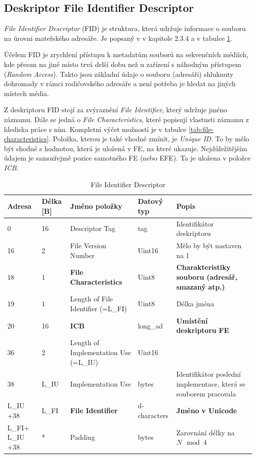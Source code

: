 \subsection{Deskriptor File Identifier Descriptor}
\label{subsec:fid}
\textit{File Identifier Descriptor} (FID) je struktura, která udržuje informace o souboru na úrovni mateřského adresáře. Je popsaný v \cite{osta-udf-0201} v kapitole 2.3.4 a v tabulce \ref{tab:fid}.

Účelem FID je zrychlení přístupu k metadatům souborů na sekvenčních médiích, kde přesun na jiné místo trvá delší dobu než u zařízení s náhodným přístupem (\textit{Random Access}). Takto jsou základní údaje o souboru (adresáři) shluknuty dohromady v rámci rodičovského adresáře a není potřeba je hledat na jiných místech média.

Z deskriptoru FID stojí za zvýraznění \textit{File Identifier}, který udržuje jméno záznamu. Dále se jedná o \textit{File Characteristics}, které popisují vlastnsti záznamu z hlediska práce s ním. Kompletní výčet možností je v tabulce \ref{tab:file-characteristics}. Položka, kterou je také vhodné zmínit, je \textit{Unique ID}. To by mělo být shodné s hodnotou, která je uložená v FE, na které ukazuje. Nejdůležitějším údajem je samozřejmě pozice samotného FE (nebo EFE). Ta je uložena v položce \textit{ICB}. 
\begin{table}[]
    \centering
    \begin{tabular}{ | l | l | p{3.7cm} | p{1.8cm} | p{4.2cm} | }
        \hline
        Adresa  & Délka [B]   & Jméno položky & Datový typ    & Popis \\ \hline\hline
        0   &16               & Descriptor Tag                    & tag           & Identifikátor deskriptoru \\ \hline
        16  &2                & File Version Number               & Uint16        & Mělo by být nastaven na 1 \\ \hline
        18  &1                & \textbf{File Characteristics}     & Uint8         & \textbf{Charakteristiky souboru (adresář, smazaný atp.)} \\ \hline
        19  &1                & Length of File Identifier (=L\_FI)& Uint8         & Délka jména \\ \hline
        20  &16               & \textbf{ICB}                      & long\_ad      & \textbf{Umístění deskriptoru FE} \\ \hline
        36  &2                & Length of Implementation Use (=L\_IU)& Uint16     &  \\ \hline
        38  &L\_IU            & Implementation Use                & bytes         & Identifikátor poslední implementace, která se souborem pracovala \\ \hline
        L\_IU$+38$&L\_FI      & \textbf{File Identifier}          & d-characters  & \textbf{Jméno v Unicode} \\ \hline
        L\_FI$+$L\_IU$+38$&*  & Padding                           & bytes         & Zarovnání délky na $N \mod 4$ \\ \hline
    \end{tabular}
    \caption{File Identifier Descriptor\label{tab:fid}}
\end{table}
